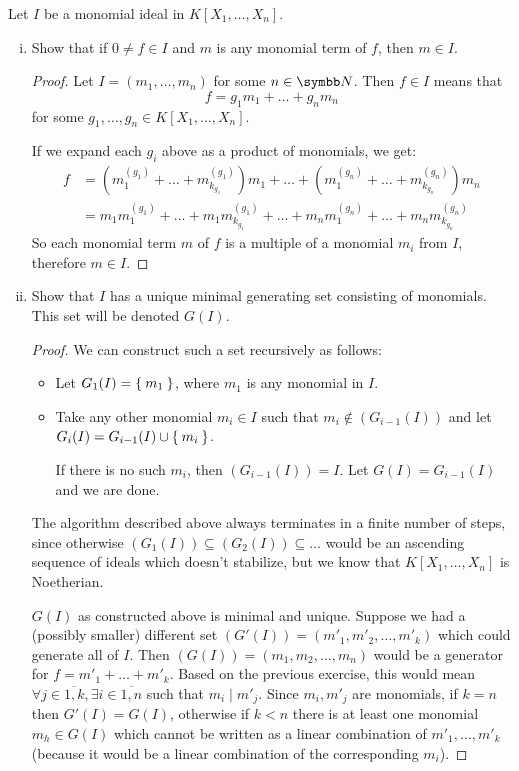 \begin{problem*}{6}
Let \(I\) be a monomial ideal in \(K[X_1, \dots, X_n]\).
\begin{enumerate}[(i)]
    \item Show that if \(0 \neq f \in I\) and \(m\) is any monomial term of \(f\), then \(m \in I\).
    \begin{proof}
    Let \(I = (m_1, \dots, m_n)\) for some \(n \in \naturals\). Then \(f \in I\) means that
    \[
        f = g_1 m_1 + \dots + g_n m_n
    \]
    for some \(g_1, \dots, g_n \in K[X_1, \dots, X_n]\).
    
    If we expand each \(g_i\) above as a product of monomials, we get:
    \begin{align*}
        f &= (m^{(g_1)}_1 + \dots + m^{(g_1)}_{k_{g_1}}) m_1 + \dots + (m^{(g_n)}_1 + \dots + m^{(g_n)}_{k_{g_n}}) m_n \\
        &= m_1 m^{(g_1)}_1 + \dots + m_1 m^{(g_1)}_{k_{g_1}} + \dots + m_n m^{(g_n)}_1 + \dots + m_n m^{(g_n)}_{k_{g_n}}
    \end{align*}
    So each monomial term \(m\) of \(f\) is a multiple of a monomial \(m_i\) from \(I\), therefore \(m \in I\).
    \end{proof}
    
    \item Show that \(I\) has a unique minimal generating set consisting of monomials. This set will be denoted \(G(I)\).
    \begin{proof}
    We can construct such a set recursively as follows:
    \begin{itemize}
        \item Let \(G_1(I) = \Set{ m_1 }\), where \(m_1\) is any monomial in \(I\).
        \item Take any other monomial \(m_i \in I\) such that \(m_i \not\in (G_{i-1}(I))\) and let \(G_{i}(I) = G_{i-1}(I) \cup \Set{ m_i }\).

        If there is no such \(m_i\), then \((G_{i-1}(I)) = I\). Let \(G(I) = G_{i-1}(I)\) and we are done.
    \end{itemize}
    The algorithm described above always terminates in a finite number of steps, since otherwise \((G_1(I)) \subseteq (G_2(I)) \subseteq \dots\) would be an ascending sequence of ideals which doesn't stabilize, but we know that \(K[X_1, \dots, X_n]\) is Noetherian.
    
    \(G(I)\) as constructed above is minimal and unique. Suppose we had a (possibly smaller) different set \((G'(I)) = (m'_1, m'_2, \dots, m'_k)\) which could generate all of \(I\). Then \((G(I)) = (m_1, m_2, \dots, m_n)\) would be a generator for \(f = m'_1 + \dots + m'_k\). Based on the previous exercise, this would mean \(\forall j \in \overline{1, k}, \exists i \in \overline{1, n}\) such that \(m_i \mid m'_j\). Since \(m_i, m'_j\) are monomials, if \(k = n\) then \(G'(I) = G(I)\), otherwise if \(k < n\) there is at least one monomial \(m_h \in G(I)\) which cannot be written as a linear combination of \(m'_1, \dots, m'_k\) (because it would be a linear combination of the corresponding \(m_i\)).
    \end{proof}
\end{enumerate}
\end{problem*}

